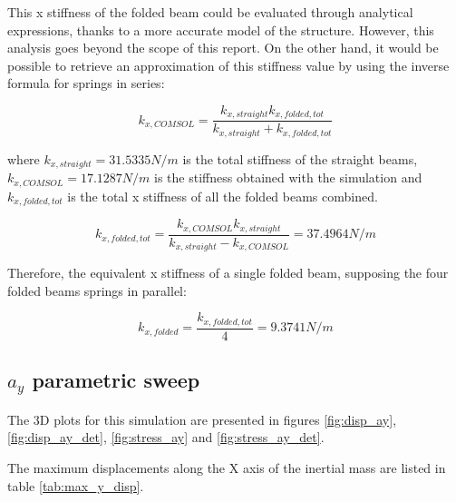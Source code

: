 \documentclass[lettersize,journal]{IEEEtran}
\begin{document}
    This x stiffness of the folded beam could be evaluated through analytical expressions, thanks to a more accurate model of the structure. However, this analysis goes beyond the scope of this report. On the other hand, it would be possible to retrieve an approximation of this stiffness value by using the inverse formula for springs in series:
    
    \begin{equation}\label{eq:kx_adjust}
        k_{x,COMSOL}=\frac{k_{x,straight}k_{x,folded,tot}}{k_{x,straight}+k_{x,folded,tot}}
    \end{equation}
    
    where \(k_{x,straight}=31.5335N/m\) is the total stiffness of the straight beams, \(k_{x,COMSOL}=17.1287N/m\) is the stiffness obtained with the simulation and \(k_{x,folded,tot}\) is the total x stiffness of all the folded beams combined.
    
    \begin{equation}\label{eq:kx_folded_tot}
        k_{x,folded,tot}=\frac{k_{x,COMSOL}k_{x,straight}}{k_{x,straight}-k_{x,COMSOL}}=37.4964N/m
    \end{equation}
    
    Therefore, the equivalent x stiffness of a single folded beam, supposing the four folded beams springs in parallel:
    
    \begin{equation}\label{eq:kx_folded}
        k_{x,folded}=\frac{k_{x,folded,tot}}{4}=9.3741N/m
    \end{equation}
    
    \bigskip
    \subsection{\(a_y\) parametric sweep}
    The 3D plots for this simulation are presented in figures \ref{fig:disp_ay}, \ref{fig:disp_ay_det}, \ref{fig:stress_ay} and \ref{fig:stress_ay_det}.
    
    The maximum displacements along the X axis of the inertial mass are listed in table \ref{tab:max_y_disp}.
    
\end{document}
